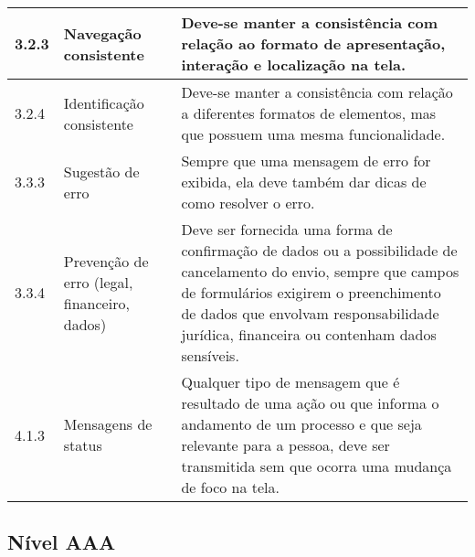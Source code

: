 \begin{appendices}
{\begin{minipage}{\linewidth}
{\begin{tabular}{|l|l|p{400px}|}
    3.2.3 &
        Navegação consistente & Deve-se manter a consistência com relação ao formato de apresentação, interação e localização na tela. \\ \hline
    3.2.4 &
        Identificação consistente & Deve-se manter a consistência com relação a diferentes formatos de elementos, mas que possuem uma mesma funcionalidade. \\ \hline
    3.3.3  &
        Sugestão de erro & Sempre que uma mensagem de erro for exibida, ela deve também dar dicas de como resolver o erro. \\ \hline
    3.3.4  &
        Prevenção de erro (legal, financeiro, dados) & Deve ser fornecida uma forma de confirmação de dados ou a possibilidade de cancelamento do envio, sempre que campos de formulários exigirem o preenchimento de dados que envolvam responsabilidade jurídica, financeira ou contenham dados sensíveis. \\ \hline
    4.1.3  &
         Mensagens de status & Qualquer tipo de mensagem que é resultado de uma ação ou que informa o andamento de um processo e que seja relevante para a pessoa, deve ser transmitida sem que ocorra uma mudança de foco na tela. \\ \hline

\end{tabular}
}
\label{Diretrizes nível AA}

\end{minipage}

}

\subsection{Nível AAA}
{

}
\end{appendices}
